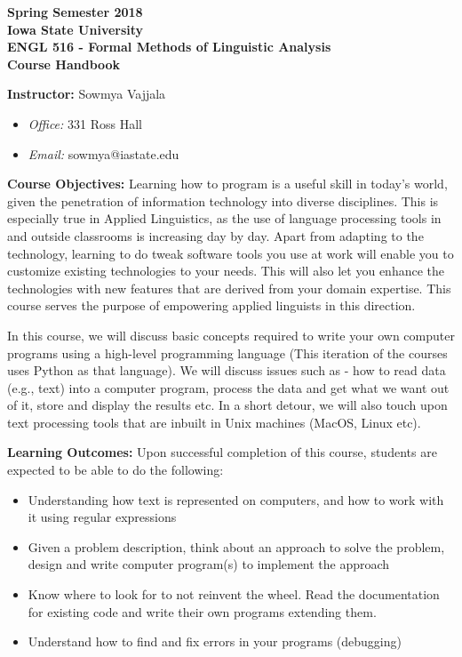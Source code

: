 \documentclass[11pt,a4paper]{article}
\begin{document}
\begin{center}
  \textbf{Spring Semester 2018 \\ Iowa State University\\[3ex]
  {\Large ENGL 516 - Formal Methods of Linguistic Analysis}\\[3ex]
  Course Handbook
}
\end{center}

\bigskip
\textbf{\large Instructor:}
  Sowmya Vajjala
  \begin{itemize}\vspace*{-.4\baselineskip}\itemsep-.4ex
  \item \textit{Office:} 331 Ross Hall
  \item \textit{Email:} sowmya@iastate.edu
\end{itemize}

\textbf{\large Course Objectives:}
Learning how to program is a useful skill in today's world, given the penetration of information technology into diverse disciplines. This is especially true in Applied Linguistics, as the use of language processing tools in and outside classrooms is increasing day by day. Apart from adapting to the technology, learning to do tweak software tools you use at work will enable you to customize existing technologies to your needs. This will also let you enhance the technologies with new features that are derived from your domain expertise. This course serves the purpose of empowering applied linguists in this direction.

In this course, we will discuss basic concepts required to write your own computer programs using a high-level programming language (This iteration of the courses uses Python as that language). We will discuss issues such as - how to read data (e.g., text) into a computer program, process the data and get what we want out of it, store and display the results etc. In a short detour, we will also touch upon text processing tools that are inbuilt in Unix machines (MacOS, Linux etc). \vspace{0.5cm}

\textbf{\large Learning Outcomes:} Upon successful completion of this course, students are expected to be able to do the following:
\begin{itemize}
\item Understanding how text is represented on computers, and how to work with it using regular expressions
\item Given a problem description, think about an approach to solve the problem, design and write computer program(s) to implement the approach
\item Know where to look for to not reinvent the wheel. Read the documentation for existing code and write their own programs extending them.
\item Understand how to find and fix errors in your programs (debugging)
\end{itemize}
\end{document}
